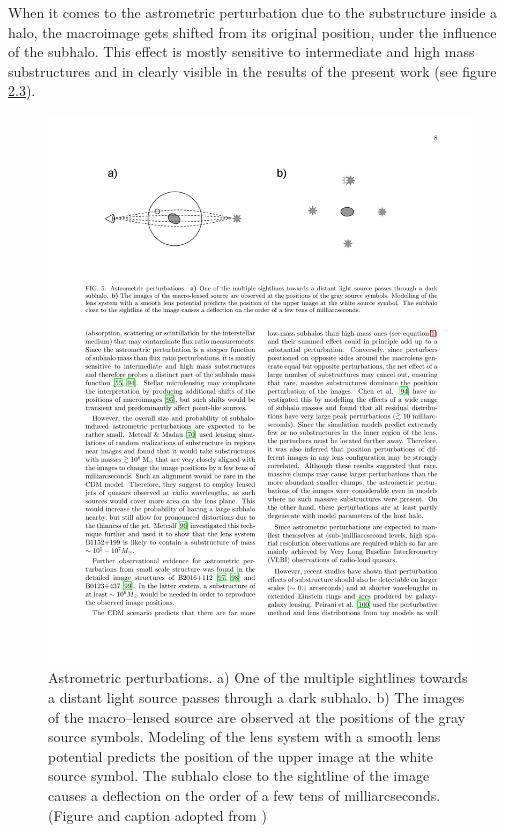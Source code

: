 \documentclass[paper=a4, fontsize=11pt]{scrartcl} %
\numberwithin{equation}{section} %
\numberwithin{figure}{section} %
\numberwithin{table}{section} %
\begin{document}
  When it comes to the astrometric perturbation due to the substructure inside a halo, the macroimage gets shifted from its original position, under the influence of the subhalo. This effect is mostly sensitive to intermediate and high mass substructures \citet{moustakas09} and in clearly visible in the results of the present work (see figure \hyperref[fig:astrometric_perturbation]{2.3}).

 \begin{figure}
\label{fig:astrometric_perturbation}
\centering
\includegraphics[width=1.0\textwidth]{figs/astrometric_perturbation}
\caption {Astrometric perturbations. a) One of the multiple sightlines towards a distant light source passes through a dark subhalo. b) The images of the macro--lensed source are observed at the positions of the gray source symbols. Modeling of the lens system with a smooth lens potential predicts the position of the upper image at the white source symbol. The subhalo close to the sightline of the image causes a deflection on the order of a few tens of milliarcseconds. (Figure and caption adopted from \citet{zackrisson09})}
 \end{figure}
 
\end{document}

